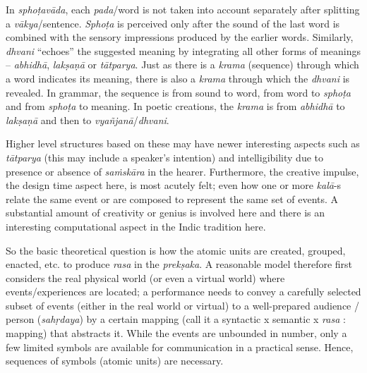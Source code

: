 In \textsl{sphoṭavāda}, each \textsl{pada}/word is not taken into account separately after splitting a \textsl{vākya}/sentence. \textsl{Sphoṭa} is perceived only after the sound of the last word is combined with the sensory impressions produced by the earlier words. Similarly, \textsl{dhvani} “echoes” the suggested meaning by integrating all other forms of meanings -- \textsl{abhidhā}, \textsl{lakṣaṇā} or \textsl{tātparya}. Just as there is a \textsl{krama} (sequence) through which a word indicates its meaning, there is also a \textsl{krama} through which the \textsl{dhvani} is revealed. In grammar, the sequence is from sound to word, from word to \textsl{sphoṭa} and from \textsl{sphoṭa} to meaning. In poetic creations, the \textsl{krama} is from \textsl{abhidhā} to \textsl{lakṣaṇā} and then to \textsl{vyañjanā}/\textsl{dhvani}.

Higher level structures based on these may have newer interesting aspects such as \textsl{tātparya} (this may include a speaker’s intention) and intelligibility due to presence or absence of \textsl{saṁskāra} in the hearer. Furthermore, the creative impulse, the design time aspect here, is most acutely felt; even how one or more \textsl{kalā}-s relate the same event or are composed to represent the same set of events. A substantial amount of creativity or genius  is involved here and there is an interesting computational aspect in the Indic tradition here.

So the basic theoretical question is how the atomic units are created, grouped, enacted, etc. to produce \textsl{rasa} in the \textsl{prekṣaka}. A reasonable model therefore first considers the real physical world (or even a virtual world) where events/experiences are located; a performance needs to convey a carefully selected subset of events (either in the real world or virtual) to a well-prepared audience / person (\textsl{sahṛdaya}) by a certain mapping (call it a syntactic x semantic  x \textsl{rasa} : mapping) that abstracts it. While the events are unbounded in number, only a few limited symbols are available for communication in a practical sense. Hence, sequences of symbols (atomic units) are necessary.

